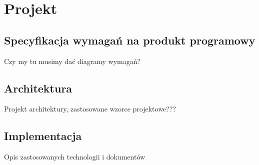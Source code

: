 \section{Projekt}
\subsection{Specyfikacja wymagań na produkt programowy}
Czy my tu musimy dać diagramy wymagań?
\subsection{Architektura}
Projekt architektury, zastosowane wzorce projektowe???
\subsection{Implementacja}
Opis zastosowanych technologii i dokumentów